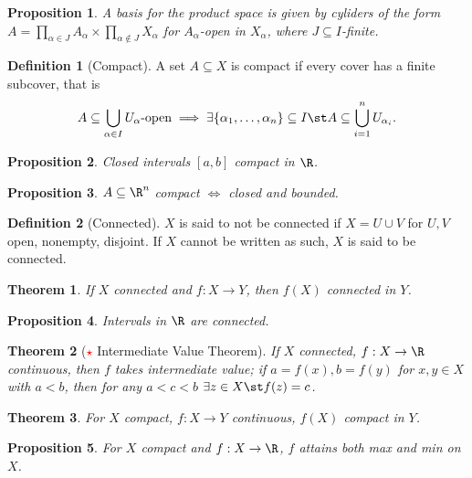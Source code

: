 \documentclass[12pt, oneside]{article}
\newcommand*{\important}{\textcolor{red}{$\star$} }
\theoremstyle{definition}
\newtheorem{defn}{Definition}
\theoremstyle{plain}
\newtheorem{thm}{Theorem}
\newtheorem{prop}{Proposition}
\theoremstyle{remark}
\begin{document}
\begin{prop}
  A basis for the product space is given by cyliders of the form $A = \prod_{\alpha \in J} A_\alpha \times \prod_{\alpha \notin J} X_\alpha$ for $A_\alpha$-open in $X_\alpha$, where $J \subseteq I$-finite.
\end{prop}

\begin{defn}[Compact]
  A set $A \subseteq X$ is compact if every cover has a finite subcover, that is \[
  A \subseteq \bigcup_{\alpha \in I} U_\alpha \text{-open} \implies \exists \{\alpha_1, \dots, \alpha_n\}   \subseteq I \st A \subseteq \bigcup_{i=1}^n U_{\alpha_i}.
  \]
\end{defn}

\begin{prop}
  Closed intervals $[a, b]$ compact in $\R$.
\end{prop}

\begin{prop}
  $A \subseteq \R^n$ compact $\iff $ closed and bounded.
\end{prop}

\begin{defn}[Connected]
  $X$ is said to not be connected if $X = U \cup V$ for $U, V$ open, nonempty, disjoint. If $X$ cannot be written as such, $X$ is said to be connected.
\end{defn}

\begin{thm}
  If $X$ connected and $f : X \to Y$, then $f(X)$ connected in $Y$.
\end{thm}

\begin{prop}
  Intervals in $\R$ are connected.
\end{prop}

\begin{thm}[\important Intermediate Value Theorem]
  If $X$ connected, $f : X \to \R$ continuous, then $f$ takes intermediate value; if $a = f(x), b = f(y)$ for $x, y \in X$ with $a < b$, then for any $a < c < b$ $\exists z \in X \st f(z) = c$.
\end{thm}

\begin{thm}
  For $X$ compact, $f : X \to Y$ continuous, $f(X)$ compact in $Y$.
\end{thm}

\begin{prop}
  For $X$ compact and $f: X \to \R$, $f$ attains both max and min on $X$.
\end{prop}
\end{document}
